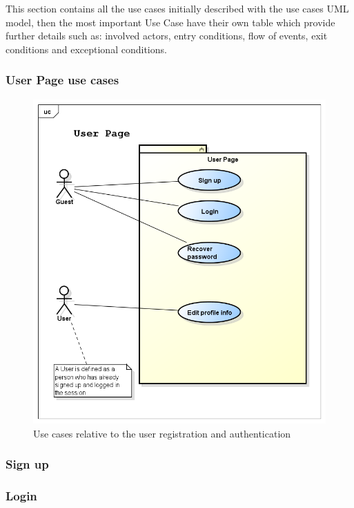 This section contains all the use cases initially described with the use cases UML model, then the most important Use Case have their own table which provide further details such as: involved actors, entry conditions, flow of events,  exit conditions and exceptional conditions.

\subsubsection{User Page use cases}
\begin{figure}[htp] 

\includegraphics[width=\textwidth]{usecases/png/userpage} 
\caption{Use cases relative to the user registration and authentication} 
\label{fig:userpage} 
\end{figure} 

\newpage
\subsubsection{Sign up}


 \newpage
\subsubsection{Login}

\newpage
